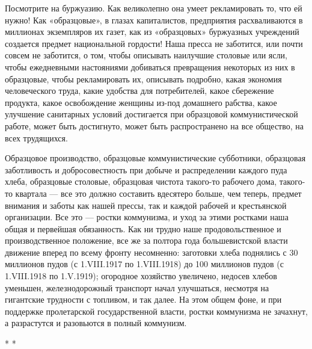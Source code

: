 \documentclass[12pt]{article}
\newcommand{\parnum}{(\arabic{parcount})}
\newcounter{parcount}
\newenvironment{parnumbers}{%
  \par%
  \everypar{\noindent \stepcounter{parcount}\marginpar[]{\parnum}}%
}{}
\begin{document}
\begin{parnumbers}
Посмотрите на буржуазию. Как великолепно она умеет рекламировать то, что ей нужно! Как «образцовые», в глазах капиталистов, предприятия расхваливаются в миллионах экземпляров их газет, как из «образцовых» буржуазных учреждений создается предмет национальной гордости! Наша пресса не заботится, или почти совсем не заботится, о том, чтобы описывать наилучшие столовые или ясли, чтобы ежедневными настояниями добиваться превращения некоторых из них в образцовые, чтобы рекламировать их, описывать подробно, какая экономия человеческого труда, какие удобства для потребителей, какое сбережение продукта, какое освобождение женщины из-под домашнего рабства, какое улучшение санитарных условий достигается при образцовой коммунистической работе, может быть достигнуто, может быть распространено на все общество, на всех трудящихся.

Образцовое производство, образцовые коммунистические субботники, образцовая заботливость и добросовестность при добыче и распределении каждого пуда хлеба, образцовые столовые, образцовая чистота такого-то рабочего дома, такого-то квартала — все это должно составить вдесятеро больше, чем теперь, предмет внимания и заботы как нашей прессы, так и каждой рабочей и крестьянской организации. Все это — ростки коммунизма, и уход за этими ростками наша общая и первейшая обязанность. Как ни трудно наше продовольственное и производственное положение, все же за полтора года большевистской власти движение вперед по всему фронту несомненно: заготовки хлеба поднялись с 30 миллионов пудов (с 1.VIII.1917 по 1.VIII.1918) до 100 миллионов пудов (с 1.VIII.1918 по 1.V.1919); огородное хозяйство увеличено, недосев хлебов уменьшен, железнодорожный транспорт начал улучшаться, несмотря на гигантские трудности с топливом, и так далее. На этом общем фоне, и при поддержке пролетарской государственной власти, ростки коммунизма не зачахнут, а разрастутся и разовьются в полный коммунизм.
\end{parnumbers}

\centering * * *
\end{document}
